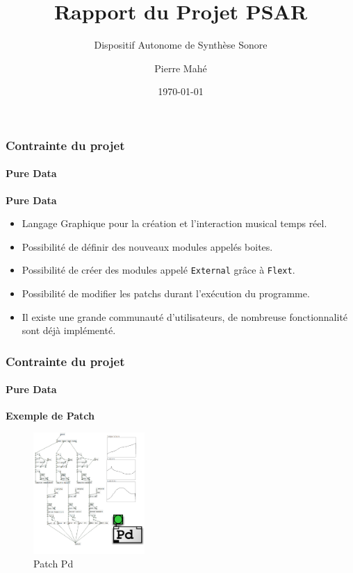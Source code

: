 \documentclass{beamer}
\title{Rapport du Projet PSAR}
\subtitle{Dispositif Autonome de Synthèse Sonore}
\institute{Encadrant : Hugues Genevois}
\author{Pierre Mahé}
\date{\today}
\begin{document}
\begin{frame}
\titlepage
\end{frame}


\begin{frame}
\frametitle{Contrainte du projet}
\framesubtitle{Pure Data}
\textbf{Pure Data}
\begin{itemize}
\item Langage Graphique pour la création et l'interaction musical temps réel.
\item Possibilité de définir des nouveaux modules appelés boites.
\item Possibilité de créer des modules appelé \texttt{External} grâce à \texttt{Flext}.
\item Possibilité de modifier les patchs durant l’exécution du programme.
\item Il existe une grande communauté d'utilisateurs, de nombreuse fonctionnalité sont déjà implémenté.
\end{itemize}
\end{frame}

\begin{frame}
\frametitle{Contrainte du projet}
\framesubtitle{Pure Data}
\textbf{Exemple de Patch}
\begin{figure}
  \centering
  \includegraphics[width=160px]{pd.jpg} 
	\caption{Patch Pd}
\end{figure}
\end{frame}
\end{document}
